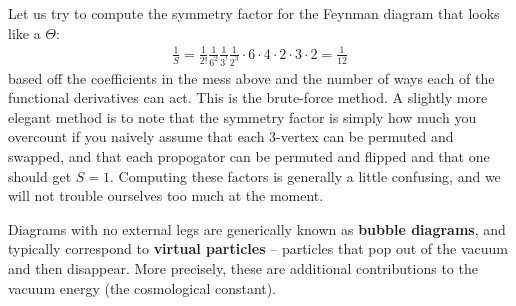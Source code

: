 \documentclass{../mathnotes}
\begin{document}
Let us try to compute the symmetry factor for the Feynman diagram that looks like a $\Theta$:
\begin{align*}
    \frac{1}{S}=\frac{1}{2!}\frac{1}{6^2}\frac{1}{3^!}\frac{1}{2^3}\cdot 6\cdot 4\cdot 2\cdot 3\cdot 2=\frac{1}{12}
\end{align*}
based off the coefficients in the mess above and the number of ways each of the functional  derivatives can act. This is the brute-force method.
A slightly more elegant method is to note that the symmetry factor is simply how much you overcount if you naively assume that each 3-vertex can
be permuted and swapped, and that each propogator can be permuted and flipped and that one should get $S=1$. Computing these factors is generally
a little confusing, and we will not trouble ourselves too much at the moment.

Diagrams with no external legs are generically known as \textbf{bubble diagrams}, and typically correspond to \textbf{virtual particles} -- particles that
pop out of the vacuum and then disappear. More precisely, these are additional contributions to the vacuum energy (the cosmological constant).
\end{document}
